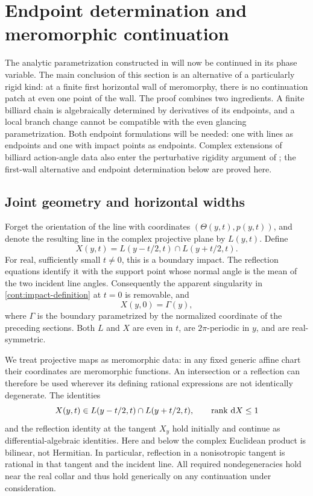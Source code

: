 \section{Endpoint determination and meromorphic continuation}
\label{sec:continuation}

The analytic parametrization constructed in
 will now be continued in its phase
variable.  The main conclusion of this section is an alternative of a
particularly rigid kind: at a finite first horizontal wall of
meromorphy, there is no continuation patch at even one point of the
wall.  The proof combines two ingredients.  A finite billiard chain is
algebraically determined by derivatives of its endpoints, and a local
branch change cannot be compatible with the even glancing
parametrization.  Both endpoint formulations will be needed: one with
lines as endpoints and one with impact points as endpoints.
Complex extensions of billiard action-angle data also enter the
perturbative rigidity argument of \cite{KS2018}; the first-wall
alternative and endpoint determination below are proved here.

\subsection{Joint geometry and horizontal widths}

Forget the orientation of the line with coordinates
\((\Theta(y,t),p(y,t))\), and denote the resulting line in the complex
projective plane by \(L(y,t)\).  Define
\begin{equation}
 X(y,t)=L(y-t/2,t)\cap L(y+t/2,t).
 \label{cont:impact-definition}
\end{equation}
For real, sufficiently small \(t\ne0\), this is a boundary impact.  The
reflection equations identify it with the support point whose normal
angle is the mean of the two incident line angles.  Consequently the
apparent singularity in \eqref{cont:impact-definition} at \(t=0\) is
removable, and
\[
 X(y,0)=\Gamma(y),
\]
where \(\Gamma\) is the boundary parametrized by the normalized
coordinate of the preceding sections.  Both \(L\) and \(X\) are even in
\(t\), are \(2\pi\)-periodic in \(y\), and are real-symmetric.

We treat projective maps as meromorphic data: in any fixed generic
affine chart their coordinates are meromorphic functions.  An
intersection or a reflection can therefore be used wherever its
defining rational expressions are not identically degenerate.  The
identities
\begin{equation}
 X(y,t)\in L(y-t/2,t)\cap L(y+t/2,t),\qquad
 \operatorname{rank} \,\mathrm d X\le1
 \label{cont:incidence-rank}
\end{equation}
and the reflection identity at the tangent \(X_y\) hold initially and
continue as differential-algebraic identities.  Here and below the
complex Euclidean product is bilinear, not Hermitian.  In particular,
reflection in a nonisotropic tangent is rational in that tangent and
the incident line.  All required nondegeneracies hold near the real
collar and thus hold generically on any continuation under
consideration.

